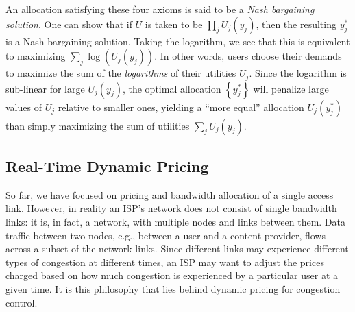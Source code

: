 An allocation satisfying these four axioms is said to be a \emph{Nash bargaining solution}. One can show that if $U$ is taken to be $\prod_j U_j(y_j)$, then the resulting $y_j^\ast$ is a Nash bargaining solution. Taking the logarithm, we see that this is equivalent to maximizing $\sum_j \log\left(U_j(y_j)\right)$. In other words, users choose their demands to maximize the sum of the \emph{logarithms} of their utilities $U_j$. Since the logarithm is sub-linear for large $U_j(y_j)$, the optimal allocation $\left\{y_j^\ast\right\}$ will penalize large values of $U_j$ relative to smaller ones, yielding a ``more equal'' allocation $U_j\left(y_j^\ast\right)$ than simply maximizing the sum of utilities $\sum_j U_j(y_j)$.


\subsection{Real-Time Dynamic Pricing}\label{sec:realtime}

So far, we have focused on pricing and bandwidth allocation of a single access link. However, in reality an ISP's network does not consist of single bandwidth links: it is, in fact, a network, with multiple nodes and links between them. Data traffic between two nodes, e.g., between a user and a content provider, flows across a subset of the network links. Since different links may experience different types of congestion at different times, an ISP may want to adjust the prices charged based on how much congestion is experienced by a particular user at a given time. It is this philosophy that lies behind dynamic pricing for congestion control.

